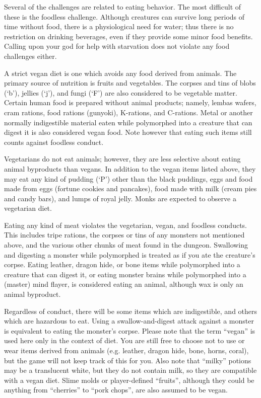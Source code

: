 Several of the challenges are related to eating behavior.  The most
difficult of these is the foodless challenge.  Although creatures
can survive long periods of time without food, there is a physiological
need for water; thus there is no restriction on drinking beverages,
even if they provide some minor food benefits.
Calling upon your god for help with starvation does
not violate any food challenges either.

A strict vegan diet is one which avoids any food derived from animals.
The primary source of nutrition is fruits and vegetables.  The
corpses and tins of blobs (`b'), jellies (`j'), and fungi (`F') are
also considered to be vegetable matter.  Certain human
food is prepared without animal products; namely, lembas wafers, cram
rations, food rations (gunyoki), K-rations, and C-rations.
Metal or another normally indigestible material eaten while polymorphed
into a creature that can digest it is also considered vegan food.
Note however that eating such items still counts against foodless conduct.

Vegetarians do not eat animals;
however, they are less selective about eating animal byproducts than vegans.
In addition to the vegan items listed above, they may eat any kind
of pudding (`P') other than the black puddings,
eggs and food made from eggs (fortune cookies and pancakes),
food made with milk (cream pies and candy bars), and lumps of
royal jelly.  Monks are expected to observe a vegetarian diet.

Eating any kind of meat violates the vegetarian, vegan, and foodless
conducts.  This includes tripe rations, the corpses or tins of any
monsters not mentioned above, and the various other chunks of meat
found in the dungeon.  Swallowing and digesting a monster while polymorphed
is treated as if you ate the creature's corpse.
Eating leather, dragon hide, or bone items while
polymorphed into a creature that can digest it, or eating monster brains
while polymorphed into a (master) mind flayer, is considered eating
an animal, although wax is only an animal byproduct.

Regardless of conduct, there will be some items which are indigestible,
and others which are hazardous to eat.  Using a swallow-and-digest
attack against a monster is equivalent to eating the monster's corpse.
Please note that the term ``vegan'' is used here only in the context of
diet.  You are still free to choose not to use or wear items derived
from animals (e.g. leather, dragon hide, bone, horns, coral), but the
game will not keep track of this for you.  Also note that ``milky''
potions may be a translucent white, but they do not contain milk,
so they are compatible with a vegan diet.  Slime molds or
player-defined ``fruits'', although they could be anything
from ``cherries'' to ``pork chops'', are also assumed to be vegan.

